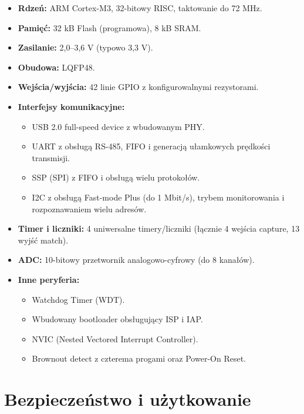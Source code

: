\documentclass[letterpaper,11pt]{report}
\begin{document}
\begin{itemize}
    \item \textbf{Rdzeń:} ARM Cortex-M3, 32-bitowy RISC, taktowanie do 72 MHz.
    \item \textbf{Pamięć:} 32 kB Flash (programowa), 8 kB SRAM.
    \item \textbf{Zasilanie:} 2,0–3,6 V (typowo 3,3 V).
    \item \textbf{Obudowa:} LQFP48.
    \item \textbf{Wejścia/wyjścia:} 42 linie GPIO z konfigurowalnymi rezystorami.
    \item \textbf{Interfejsy komunikacyjne:}
    \begin{itemize}
        \item USB 2.0 full-speed device z wbudowanym PHY.
        \item UART z obsługą RS-485, FIFO i generacją ułamkowych prędkości transmisji.
        \item SSP (SPI) z FIFO i obsługą wielu protokołów.
        \item I2C z obsługą Fast-mode Plus (do 1 Mbit/s), trybem monitorowania i rozpoznawaniem wielu adresów.
    \end{itemize}
    \item \textbf{Timer i liczniki:} 4 uniwersalne timery/liczniki (łącznie 4 wejścia capture, 13 wyjść match).
    \item \textbf{ADC:} 10-bitowy przetwornik analogowo-cyfrowy (do 8 kanałów).
    \item \textbf{Inne peryferia:}
    \begin{itemize}
        \item Watchdog Timer (WDT).
        \item Wbudowany bootloader obsługujący ISP i IAP.
        \item NVIC (Nested Vectored Interrupt Controller).
        \item Brownout detect z czterema progami oraz Power-On Reset.
    \end{itemize}
\end{itemize}

\section{Bezpieczeństwo i użytkowanie}
\end{document}

